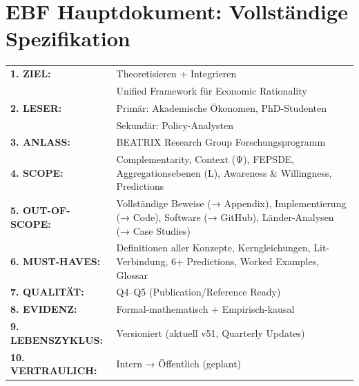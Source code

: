 \documentclass[12pt,a4paper]{article}
\begin{document}
%
%

\part{EBF Hauptdokument: Vollständige Spezifikation}

\begin{tcolorbox}[colback=bcmblue!10!white, colframe=bcmblue,
    title=\textbf{EBF ``Complementarity and Context'': Die 12 Dimensionen}]

\begin{tabular}{@{}p{3.5cm}p{10cm}@{}}
\textbf{1. ZIEL:} & Theoretisieren + Integrieren \\
& Unified Framework für Economic Rationality \\[0.5em]

\textbf{2. LESER:} & Primär: Akademische Ökonomen, PhD-Studenten \\
& Sekundär: Policy-Analysten \\[0.5em]

\textbf{3. ANLASS:} & BEATRIX Research Group Forschungsprogramm \\[0.5em]

\textbf{4. SCOPE:} & Complementarity, Context (Ψ), FEPSDE, Aggregationsebenen (L), Awareness \& Willingness, Predictions \\[0.5em]

\textbf{5. OUT-OF-SCOPE:} & Vollständige Beweise (→ Appendix), Implementierung (→ Code), Software (→ GitHub), Länder-Analysen (→ Case Studies) \\[0.5em]

\textbf{6. MUST-HAVES:} & Definitionen aller Konzepte, Kerngleichungen, Lit-Verbindung, 6+ Predictions, Worked Examples, Glossar \\[0.5em]

\textbf{7. QUALITÄT:} & Q4--Q5 (Publication/Reference Ready) \\[0.5em]

\textbf{8. EVIDENZ:} & Formal-mathematisch + Empirisch-kausal \\[0.5em]

\textbf{9. LEBENSZYKLUS:} & Versioniert (aktuell v51, Quarterly Updates) \\[0.5em]

\textbf{10. VERTRAULICH:} & Intern → Öffentlich (geplant) \\[0.5em]


\end{tabular}
\end{tcolorbox}
\end{document}
